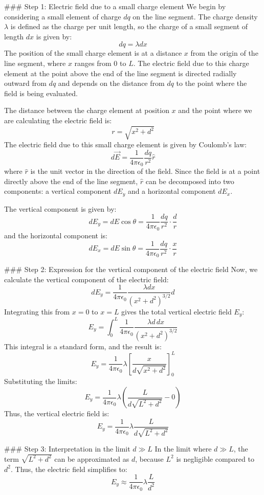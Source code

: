 ### Step 1: Electric field due to a small charge element
We begin by considering a small element of charge \( dq \) on the line segment. The charge density \( \lambda \) is defined as the charge per unit length, so the charge of a small segment of length \( dx \) is given by:
\[
dq = \lambda dx
\]
The position of the small charge element is at a distance \( x \) from the origin of the line segment, where \( x \) ranges from 0 to \( L \). The electric field due to this charge element at the point above the end of the line segment is directed radially outward from \( dq \) and depends on the distance from \( dq \) to the point where the field is being evaluated.

The distance between the charge element at position \( x \) and the point where we are calculating the electric field is:
\[
r = \sqrt{x^2 + d^2}
\]
The electric field due to this small charge element is given by Coulomb's law:
\[
d\vec{E} = \frac{1}{4 \pi \epsilon_0} \frac{dq}{r^2} \hat{r}
\]
where \( \hat{r} \) is the unit vector in the direction of the field. Since the field is at a point directly above the end of the line segment, \( \hat{r} \) can be decomposed into two components: a vertical component \( dE_y \) and a horizontal component \( dE_x \).

The vertical component is given by:
\[
dE_y = dE \cos \theta = \frac{1}{4 \pi \epsilon_0} \frac{dq}{r^2} \cdot \frac{d}{r}
\]
and the horizontal component is:
\[
dE_x = dE \sin \theta = \frac{1}{4 \pi \epsilon_0} \frac{dq}{r^2} \cdot \frac{x}{r}
\]

### Step 2: Expression for the vertical component of the electric field
Now, we calculate the vertical component of the electric field:
\[
dE_y = \frac{1}{4 \pi \epsilon_0} \frac{\lambda dx}{(x^2 + d^2)^{3/2}} d
\]
Integrating this from \( x = 0 \) to \( x = L \) gives the total vertical electric field \( E_y \):
\[
E_y = \int_0^L \frac{1}{4 \pi \epsilon_0} \frac{\lambda d \, dx}{(x^2 + d^2)^{3/2}}
\]
This integral is a standard form, and the result is:
\[
E_y = \frac{1}{4 \pi \epsilon_0} \lambda \left[ \frac{x}{d \sqrt{x^2 + d^2}} \right]_0^L
\]
Substituting the limits:
\[
E_y = \frac{1}{4 \pi \epsilon_0} \lambda \left( \frac{L}{d \sqrt{L^2 + d^2}} - 0 \right)
\]
Thus, the vertical electric field is:
\[
E_y = \frac{1}{4 \pi \epsilon_0} \lambda \frac{L}{d \sqrt{L^2 + d^2}}
\]

### Step 3: Interpretation in the limit \( d \gg L \)
In the limit where \( d \gg L \), the term \( \sqrt{L^2 + d^2} \) can be approximated as \( d \), because \( L^2 \) is negligible compared to \( d^2 \). Thus, the electric field simplifies to:
\[
E_y \approx \frac{1}{4 \pi \epsilon_0} \lambda \frac{L}{d^2}
\]

